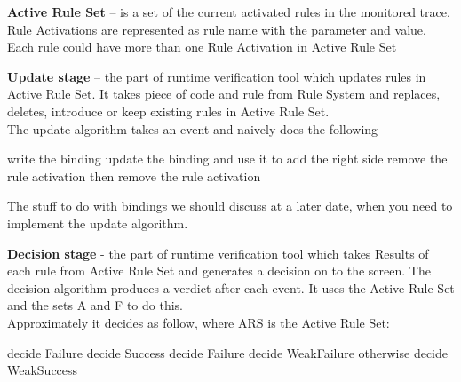 \documentclass[a4paper]{article}
\begin{document}
\vfill

\vfill

\textbf{Active Rule Set} – is a set of the current activated rules in the monitored trace. Rule Activations are represented as rule name with the parameter and value. Each rule could have more than one Rule Activation in Active Rule Set 

\vfill

\textbf{Update stage} – the part of runtime verification tool which updates rules in Active Rule Set. It takes piece of code and rule from Rule System and replaces, deletes, introduce or keep existing rules in Active Rule Set.\\
The update algorithm takes an event and naively does the following\\

\begin{algorithmic}
      \STATE write the binding 
      \STATE update the binding and use it to add the right side
        \STATE remove the rule activation
      \ENDIF
        \STATE then remove the rule activation
      \ENDIF
    \ENDIF 
  \ENDFOR 
\ENDFOR 
\end{algorithmic}
\vfill
The stuff to do with bindings we should discuss at a later date, when you need to implement the update algorithm. \par

\vfill

\textbf{Decision stage} - the part of runtime verification tool which takes Results of each rule from Active Rule Set and generates a decision on to the screen.
The decision algorithm produces a verdict after each event. It uses the Active Rule Set and the sets A and F to do this.\\
Approximately it decides as follow, where ARS is the Active Rule Set:
\begin{algorithmic}
  \STATE decide Failure
\ELSE
    \STATE decide Success
  \ENDIF
\ELSE
    \STATE decide Failure
  \ENDIF
\ELSE
    \STATE decide WeakFailure
  \ENDIF
\ELSE
  \STATE otherwise decide WeakSuccess
\ENDIF
\end{algorithmic}
\end{document}
